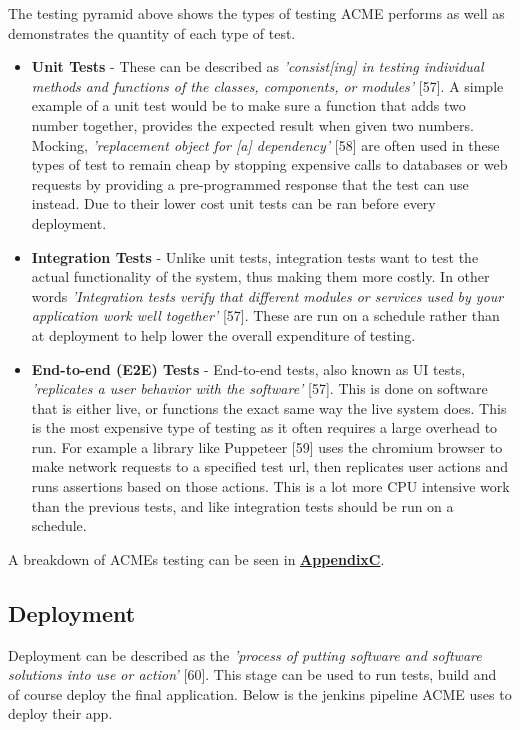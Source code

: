   The testing pyramid above shows the types of testing ACME performs as well as demonstrates the quantity of each type of test.
  \begin{itemize}
    \item \textbf{Unit Tests} - These can be described as \textit{'consist[ing] in testing individual methods and functions of the classes, components, 
    or modules'} [57]. A simple example of a unit test would be to make sure a function that adds two number together, provides the expected result
    when given two numbers. Mocking, \textit{'replacement object for [a] dependency'} [58] are often used in these types of test to remain cheap by
    stopping expensive calls to databases or web requests by providing a pre-programmed response that the test can use instead. Due to their 
    lower cost unit tests can be ran before every deployment.

    \item \textbf{Integration Tests} - Unlike unit tests, integration tests want to test the actual functionality of the system, thus 
    making them more costly. In other words \textit{'Integration tests verify that different modules or services used by your application work well
    together'} [57]. These are run on a schedule rather than at deployment to help lower the overall expenditure of testing. 
  
    \item \textbf{End-to-end (E2E) Tests} - End-to-end tests, also known as UI tests, \textit{'replicates a user behavior with the software'} [57].
    This is done on software that is either live, or functions the exact same way the live system does. This is the most expensive type of testing as
    it often requires a large overhead to run. For example a library like Puppeteer [59] uses the chromium browser to make network requests to a 
    specified test url, then replicates user actions and runs assertions based on those actions. This is a lot more CPU intensive work than the 
    previous tests, and like integration tests should be run on a schedule.
  \end{itemize}

  A breakdown of ACMEs testing can be seen in \hyperref[sec:AppendixC]{\textbf{AppendixC}}.

  \subsection{Deployment}
  \label{sec:Deployment}

  Deployment can be described as the \textit{'process of putting software and software solutions into use or action'} [60]. This stage can be
  used to run tests, build and of course deploy the final application. Below is the jenkins pipeline ACME uses to deploy their app.

